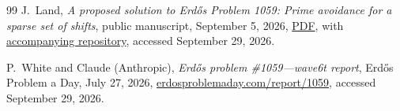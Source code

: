 \documentclass[11pt]{amsart}
\theoremstyle{definition}
\theoremstyle{remark}
\begin{document}
\begin{thebibliography}{99}
J.~Land,
\emph{A proposed solution to Erd\H{o}s Problem 1059:
Prime avoidance for a sparse set of shifts},
public manuscript, September 5, 2026,
\href{https://github.com/beetree/math_erdos_1059/blob/f18787cdae3948bb3d7cf3de4651878bb16fd3db/erdos_1059_full_proof.pdf}
{PDF}, with
\href{https://github.com/beetree/math_erdos_1059}
{accompanying repository}, accessed September 29, 2026.

P.~White and Claude (Anthropic),
\emph{Erd\H{o}s problem \#1059---wave6t report},
Erd\H{o}s Problem a Day, July 27, 2026,
\href{https://www.erdosproblemaday.com/report/1059}
{erdosproblemaday.com/report/1059}, accessed September 29, 2026.

\end{thebibliography}
\end{document}
